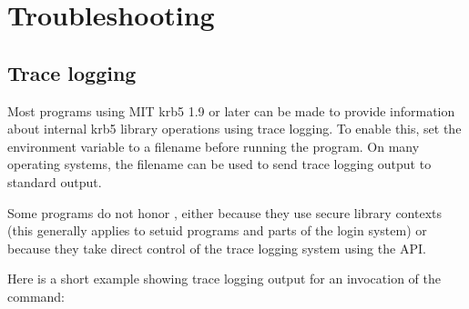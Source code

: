 \documentclass[letterpaper,10pt,english]{sphinxmanual}
\begin{document}
\chapter{Troubleshooting}
\label{\detokenize{admin/troubleshoot:troubleshoot}}\label{\detokenize{admin/troubleshoot::doc}}\label{\detokenize{admin/troubleshoot:troubleshooting}}

\section{Trace logging}
\label{\detokenize{admin/troubleshoot:trace-logging}}\label{\detokenize{admin/troubleshoot:id1}}
Most programs using MIT krb5 1.9 or later can be made to provide
information about internal krb5 library operations using trace
logging.  To enable this, set the  environment variable
to a filename before running the program.  On many operating systems,
the filename  can be used to send trace logging output
to standard output.

Some programs do not honor , either because they use
secure library contexts (this generally applies to setuid programs and
parts of the login system) or because they take direct control of the
trace logging system using the API.

Here is a short example showing trace logging output for an invocation
of the  command:

%
\begin{sphinxVerbatim}[commandchars=\\\{\}]
    
\PYG{p}{[}\PYG{p}{]}     
      
\PYG{p}{[}\PYG{p}{]}    
     
         
   
\end{sphinxVerbatim}
\end{document}

